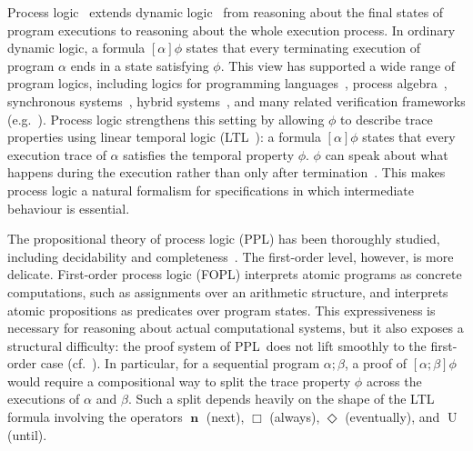 \documentclass[manuscript,screen]{acmart}
\DeclareMathOperator{\seq}{;}
\DeclareMathOperator{\nxt}{\mathbf{n}}
\DeclareMathOperator{\unt}{U}
\DeclareMathOperator{\ev}{\Diamond}
\newcommand{\PPL}[0]{\mbox{PPL}}
\newcommand{\FOPL}[0]{\mbox{FOPL}}
\begin{document}
Process logic~\cite{Harel82} extends dynamic logic~\cite{Harel00} from reasoning about the final states of program executions to reasoning about the whole execution process. In ordinary dynamic logic, a formula $[\alpha]\phi$ states that every terminating execution of program $\alpha$ ends in a state satisfying $\phi$. This view has supported a wide range of program logics, including logics for programming languages~\cite{Beckert2016,RustyDL26}, process algebra~\cite{DLForCCS,GKAT-PDL25}, synchronous systems~\cite{Zhang21,Zhang22}, hybrid systems~\cite{Platzer18,Platzer15dGL}, and many related verification frameworks (e.g.~\cite{Reif95,Rustan07,Platzer08,Zhang21,Minh24}). Process logic strengthens this setting by allowing $\phi$ to describe trace properties using linear temporal logic (LTL~\cite{TemporalLogic}): a formula $[\alpha]\phi$ states that every execution trace of $\alpha$ satisfies the temporal property $\phi$. $\phi$ can speak about what happens during the execution rather than only after termination~\cite{Harel82}. This makes process logic a natural formalism for specifications in which intermediate behaviour is essential. 


The propositional theory of process logic (\PPL) has been thoroughly studied, including decidability and completeness~\cite{Harel82}. The first-order level, however, is more delicate. First-order process logic (\FOPL) interprets atomic programs as concrete computations, such as assignments over an arithmetic structure, and interprets atomic propositions as predicates over program states. This expressiveness is necessary for reasoning about actual computational systems, but it also exposes a structural difficulty: the proof system of \PPL\ does not lift smoothly to the first-order case (cf.~\cite{Harel82,Harel00}). In particular, for a sequential program $\alpha\seq\beta$, a proof of $[\alpha\seq\beta]\phi$ would require a compositional way to split the trace property $\phi$ across the executions of $\alpha$ and $\beta$. Such a split depends heavily on the shape of the LTL formula involving the operators $\nxt$ (next), $\Box$ (always), $\ev$ (eventually), and $\unt$ (until). 
\end{document}
